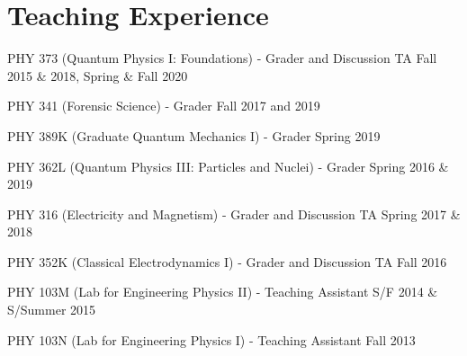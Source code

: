 \documentclass[letterpaper]{article}
\renewenvironment{itemize}{
  \begin{list}{}{
    \setlength{\leftmargin}{1.5em}
  }
}{
  \end{list}
}
\begin{document}
\section*{Teaching Experience}
\begin{itemize}

\item PHY 373 (Quantum Physics I: Foundations) - Grader and Discussion TA \hfill{Fall 2015 \& 2018, Spring \& Fall 2020}

\item PHY 341 (Forensic Science) - Grader \hfill Fall 2017 and 2019

\item PHY 389K (Graduate Quantum Mechanics I) - Grader \hfill{Spring 2019}

\item PHY 362L (Quantum Physics III: Particles and Nuclei) - Grader \hfill{Spring 2016 \& 2019}

\item PHY 316 (Electricity and Magnetism) - Grader and Discussion TA \hfill Spring 2017 \& 2018

\item PHY 352K (Classical Electrodynamics I) - Grader and Discussion TA \hfill Fall 2016

\item PHY 103M (Lab for Engineering Physics II) - Teaching Assistant \hfill {S/F 2014 \& S/Summer 2015}

\item PHY 103N (Lab for Engineering Physics I) - Teaching Assistant \hfill {Fall 2013}

\end{itemize}
\end{document}
